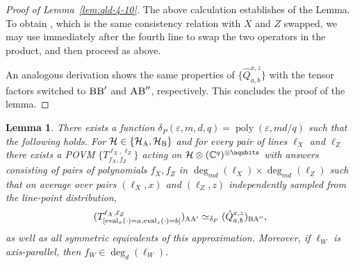 \documentclass[11pt]{article}
\newtheorem{lemma}[theorem]{Lemma}
\theoremstyle{definition}
\newcommand{\C}{\ensuremath{\mathbb{C}}}
\newcommand{\mH}{\ensuremath{\mathcal{H}}}
\DeclareMathOperator{\poly}{poly}
\newcommand{\eps}{\varepsilon}
\newcommand{\labelstyle}[1]{\ensuremath{\textsc{#1}}\xspace}
\newcommand{\alice}{\labelstyle{A}}
\newcommand{\bob}{\labelstyle{B}}
\renewcommand{\line}{\mathbf{\ell}}
\newcommand{\eval}{\mathrm{eval}}
\begin{document}
\begin{proof}[Proof of Lemma~\ref{lem:qld-4-10}]
        The above calculation establishes  of the Lemma. To obtain , which is the same  consistency relation with $X$ and $Z$ swapped, we may use  immediately after the fourth line to swap the two operators in the product, and then proceed as above.
	
	An analogous derivation shows the same properties of $\{ \hat{Q}^{x,z}_{a,b} \}$ with the tensor factors switched to $\bob \bob'$ and $\alice \bob''$, respectively. This concludes the proof of the lemma.
	


\end{proof}


\begin{lemma}\label{lem:qld-xz-lines}
  There exists a function $\delta_P(\eps,m,d,q) = \poly(\eps,
  md/q)$ such that the following holds. For $\mH \in \{\mH_\alice,\mH_\bob\}$ and for every pair of lines $\line_X$ and $\line_Z$ there exists a POVM $\{T^{\line_X, \line_Z}_{f_X, f_Z}\}$ acting on
  $\mathcal{H} \otimes (\C^q)^{\otimes \nqubits}$ with answers
  consisting of pairs of polynomials $f_X, f_Z$ in $\deg_{md}(\line_X)
  \times \deg_{md}(\line_Z)$
  such that on average over pairs $(\line_X, x)$ and $(\line_Z, z)$
  independently sampled from the line-point distribution,
  \begin{align*}
    (T^{\line_X, \line_Z}_{[ \eval_x(\cdot) =a, \eval_z(\cdot) = b]})_{\alice \alice'} &\simeq_{\delta_P} (\hat{Q}^{x,z}_{a, b})_{\bob \alice''}, \\
\end{align*}
  as well as all symmetric equivalents of this approximation. Moreover, if $\line_W$ is axis-parallel, then $f_W \in \deg_{d}(\line_W)$.
\end{lemma}
\end{document}
